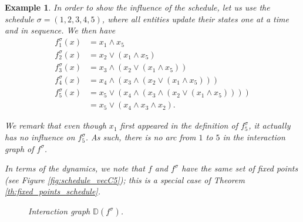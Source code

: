\documentclass[a4paper, 11pt]{book}
\numberwithin{equation}{section}
\theoremstyle{plain}
\newtheorem{example}	[equation]	{Example}
\newcommand{\IG}{\mathbb{D}}
\renewcommand{\(}{\ldbrack}
\renewcommand{\)}{\rdbrack}
\begin{document}
\begin{example} \label{ex:schedule_vecC5}
In order to show the influence of the schedule, let us use the schedule $\sigma = (1,2,3,4,5)$, where all entities update their states one at a time and in sequence. We then have
\begin{align*}
	f_1^\sigma(x) &= x_1 \land x_5\\
	f_2^\sigma(x) &= x_2 \lor ( x_1 \land x_5 )\\
	f_3^\sigma(x) &= x_3 \land ( x_2 \lor ( x_1 \land x_5 ) )\\
	f_4^\sigma(x) &= x_4 \land ( x_3 \land ( x_2 \lor ( x_1 \land x_5 ) ) )\\
	f_5^\sigma(x) &= x_5 \lor ( x_4 \land ( x_3 \land ( x_2 \lor ( x_1 \land x_5 ) ) ) ) \\
								&= x_5 \lor ( x_4 \land x_3 \land x_2 ).
\end{align*}

We remark that even though $x_1$ first appeared in the definition of $f_5^\sigma$, it actually has no influence on $f_5^\sigma$. As such, there is no arc from $1$ to $5$ in the interaction graph of $f^\sigma$.

In terms of the dynamics, we note that $f$ and $f^\sigma$ have the same set of fixed points (see Figure \ref{fig:schedule_vecC5}); this is a special case of Theorem \ref{th:fixed_points_schedule}.

\begin{figure}[!htp]
\centering
{}
\caption{Interaction graph $\IG(f^\sigma)$.}
\label{fig:IG_fsigma}
\end{figure}

	
\begin{figure}
\centering
{}
\end{figure}
\end{example}
\end{document}
